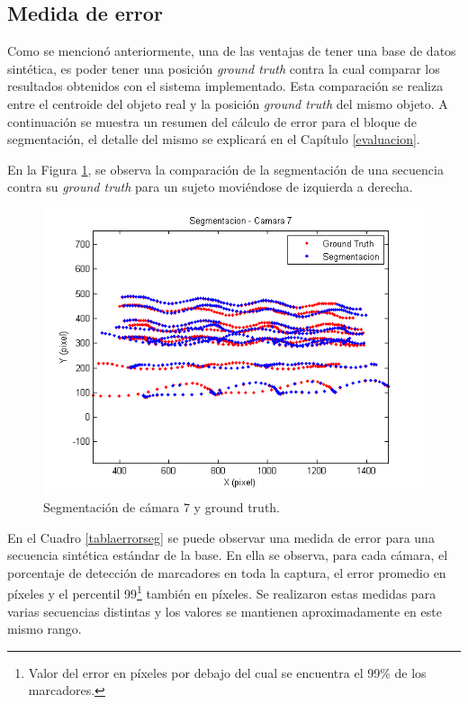\subsection{Medida de error}

Como se mencionó anteriormente, una de las ventajas de tener una base de datos sintética, es poder tener una posición \textit{ground truth} contra la cual comparar los resultados obtenidos con el sistema implementado. Esta comparación se realiza entre el centroide del objeto real y la posición \textit{ground truth} del mismo objeto. A continuación se muestra un resumen del cálculo de error para el bloque de segmentación, el detalle del mismo se explicará en el Capítulo \ref{evaluacion}. 

En la Figura \ref{ejMedErr}, se observa la comparación de la segmentación de una secuencia contra su \textit{ground truth} para un sujeto moviéndose de izquierda a derecha.

\vspace{-3mm}

\begin{figure}[H]
\begin{center}
\includegraphics[scale=0.6]{img/imagen_segmentacion_cam7_8_07_100_200.png}
\end{center}
\vspace{-7mm}
\caption{Segmentación de cámara 7 y ground truth.}
\label{ejMedErr}
\end{figure}

En el Cuadro \ref{tablaerrorseg} se puede observar una medida de error para una secuencia sintética estándar de la base. En ella se observa, para cada cámara, el porcentaje de detección de marcadores en toda la captura, el error promedio en píxeles y el percentil 99\footnote{Valor del error en píxeles por debajo del cual se encuentra el 99\% de los marcadores.} también en píxeles. Se realizaron estas medidas para varias secuencias distintas y los valores se mantienen aproximadamente en este mismo rango.

